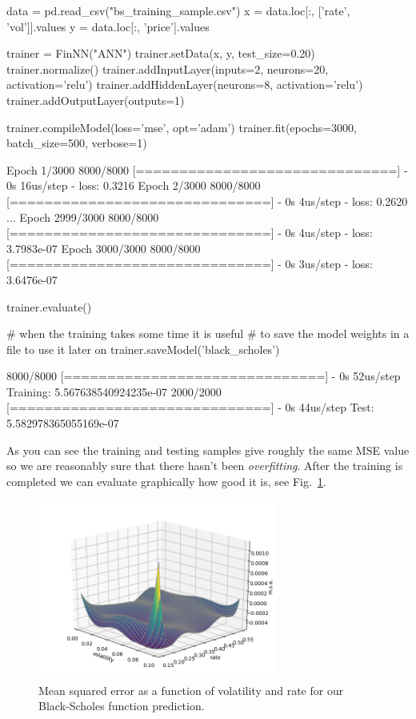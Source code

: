 \begin{ipython}
data = pd.read_csv("bs_training_sample.csv")
x = data.loc[:, ['rate', 'vol']].values
y = data.loc[:, 'price'].values

trainer = FinNN("ANN")
trainer.setData(x, y, test_size=0.20)
trainer.normalize()
trainer.addInputLayer(inputs=2, neurons=20, activation='relu')
trainer.addHiddenLayer(neurons=8, activation='relu')
trainer.addOutputLayer(outputs=1)

trainer.compileModel(loss='mse', opt='adam')
trainer.fit(epochs=3000, batch_size=500, verbose=1)
\end{ipython}
\begin{ioutput}
Epoch 1/3000
8000/8000 [==============================] - 0s 16us/step - loss: 0.3216
Epoch 2/3000
8000/8000 [==============================] - 0s 4us/step - loss: 0.2620
...
Epoch 2999/3000
8000/8000 [==============================] - 0s 4us/step - loss: 3.7983e-07
Epoch 3000/3000
8000/8000 [==============================] - 0s 3us/step - loss: 3.6476e-07
\end{ioutput}
\begin{ipython}
trainer.evaluate()

# when the training takes some time it is useful
# to save the model weights in a file to use it later on
trainer.saveModel('black_scholes')
\end{ipython}
\begin{ioutput}
8000/8000 [==============================] - 0s 52us/step
Training: 5.567638540924235e-07
2000/2000 [==============================] - 0s 44us/step
Test: 5.582978365055169e-07
\end{ioutput}

As you can see the training and testing samples give roughly the same MSE value so we are reasonably sure that there hasn't been \emph{overfitting}.
After the training is completed we can evaluate graphically how good it is, see Fig.~\ref{fig:vol_rate}. 

\begin{figure}[htb]
\centering
\includegraphics[width=0.7\textwidth]{figures/vol_rate}
\caption{Mean squared error as a function of volatility and rate for our Black-Scholes function prediction.}
\label{fig:vol_rate}
\end{figure}

